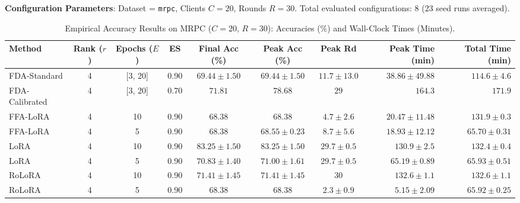 \documentclass[10pt,a4paper]{article}
\begin{document}
\textbf{Configuration Parameters}: Dataset = \texttt{mrpc}, Clients $C = 20$, Rounds $R = 30$. Total evaluated configurations: 8 (23 seed runs averaged).

\begin{table}[H]
\centering
\caption{Empirical Accuracy Results on MRPC ($C=20$, $R=30$): Accuracies (\%) and Wall-Clock Times (Minutes).}
\scriptsize
\setlength{\tabcolsep}{3.5pt}
\begin{tabular*}{\textwidth}{@{\extracolsep{\fill}}lccccccrr@{}}
\toprule
\textbf{Method} & \textbf{Rank ($r$)} & \textbf{Epochs ($E$)} & \textbf{ES} & \textbf{Final Acc (\%)} & \textbf{Peak Acc (\%)} & \textbf{Peak Rd} & \textbf{Peak Time (min)} & \textbf{Total Time (min)} \\
\midrule
FDA-Standard & 4 & [3, 20] & 0.90 & $69.44 \pm 1.50$ & $69.44 \pm 1.50$ & $11.7 \pm 13.0$ & $38.86 \pm 49.88$ & $114.6 \pm 4.6$ \\
FDA-Calibrated & 4 & [3, 20] & 0.70 & $71.81$ & $\mathbf{78.68}$ & $29$ & $164.3$ & $171.9$ \\
FFA-LoRA & 4 & 10 & 0.90 & $68.38$ & $68.38$ & $4.7 \pm 2.6$ & $20.47 \pm 11.48$ & $131.9 \pm 0.3$ \\
FFA-LoRA & 4 & 5 & 0.90 & $68.38$ & $68.55 \pm 0.23$ & $8.7 \pm 5.6$ & $18.93 \pm 12.12$ & $65.70 \pm 0.31$ \\
LoRA & 4 & 10 & 0.90 & $\mathbf{83.25 \pm 1.50}$ & $\mathbf{83.25 \pm 1.50}$ & $29.7 \pm 0.5$ & $130.9 \pm 2.5$ & $132.4 \pm 0.4$ \\
LoRA & 4 & 5 & 0.90 & $70.83 \pm 1.40$ & $71.00 \pm 1.61$ & $29.7 \pm 0.5$ & $65.19 \pm 0.89$ & $65.93 \pm 0.51$ \\
RoLoRA & 4 & 10 & 0.90 & $71.41 \pm 1.45$ & $71.41 \pm 1.45$ & $30$ & $132.6 \pm 1.1$ & $132.6 \pm 1.1$ \\
RoLoRA & 4 & 5 & 0.90 & $68.38$ & $68.38$ & $2.3 \pm 0.9$ & $\mathbf{5.15 \pm 2.09}$ & $65.92 \pm 0.25$ \\
\bottomrule
\end{tabular*}
\end{table}
\end{document}
